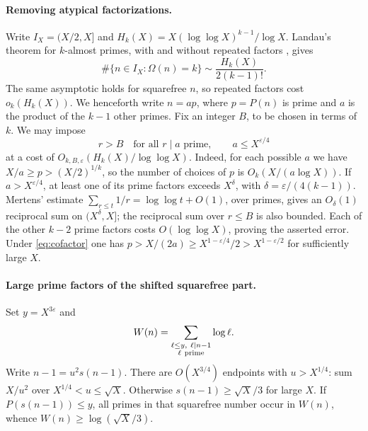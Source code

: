 \documentclass[10pt,letterpaper]{article}
\begin{document}
\paragraph{Removing atypical factorizations.}
Write \(I_X=(X/2,X]\) and \(H_k(X)=X(\log\log X)^{k-1}/\log X\).
Landau's theorem for \(k\)-almost primes, with and without repeated factors \cite{wright}, gives
\[
 \#\{n\in I_X:\Omega(n)=k\}\sim \frac{H_k(X)}{2(k-1)!}.
\]
The same asymptotic holds for squarefree \(n\), so repeated factors cost \(o_k(H_k(X))\). We henceforth write \(n=ap\), where \(p=P(n)\) is prime and \(a\) is the product of the \(k-1\) other primes. Fix an integer \(B\), to be chosen in terms of \(k\). We may impose
\[
  r>B\quad\text{for all }r\mid a\text{ prime},\qquad a\le X^{\varepsilon/4}
  \tag{2}\label{eq:cofactor}
\]
at a cost of \(O_{k,B,\varepsilon}(H_k(X)/\log\log X)\).
Indeed, for each possible \(a\) we have \(X/a\ge p>(X/2)^{1/k}\), so the number of choices of \(p\) is \(O_k(X/(a\log X))\). If \(a>X^{\varepsilon/4}\), at least one of its prime factors exceeds \(X^\delta\), with \(\delta=\varepsilon/(4(k-1))\).
Mertens' estimate \(\sum_{r\le t}1/r=\log\log t+O(1)\), over primes, gives an \(O_\delta(1)\) reciprocal sum on \((X^\delta,X]\); the reciprocal sum over \(r\le B\) is also bounded. Each of the other \(k-2\) prime factors costs \(O(\log\log X)\), proving the asserted error. Under \eqref{eq:cofactor} one has \(p>X/(2a)\ge X^{1-\varepsilon/4}/2>X^{1-\varepsilon/2}\) for sufficiently large \(X\).

\paragraph{Large prime factors of the shifted squarefree part.}
Set \(y=X^{3\varepsilon}\) and
\[
 W(n)=\sum_{\substack{\ell\le y,\ \ell\mid n-1\\ \ell\ {\rm prime}}}\log\ell.
\]
Write \(n-1=u^2s(n-1)\). There are \(O(X^{3/4})\) endpoints with \(u>X^{1/4}\): sum \(X/u^2\) over \(X^{1/4}<u\le\sqrt X\). Otherwise \(s(n-1)\ge\sqrt X/3\) for large \(X\). If \(P(s(n-1))\le y\), all primes in that squarefree number occur in \(W(n)\), whence \(W(n)\ge\log(\sqrt X/3)\).
\end{document}
